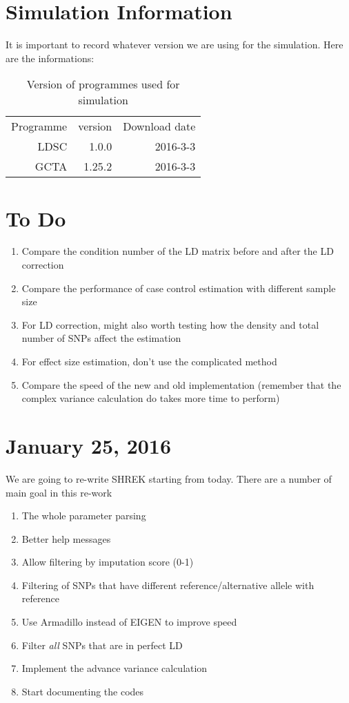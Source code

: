 \documentclass[12pt]{article}
\begin{document}
	\section{Simulation Information}
		It is important to record whatever version we are using for the simulation. 
		Here are the informations:
		\begin{table}
			\centering
			\caption{Version of programmes used for simulation}
			\begin{tabular}{rrr}
				Programme & version & Download date\\
				LDSC & 1.0.0 & 2016-3-3 \\
				GCTA & 1.25.2 & 2016-3-3
			\end{tabular}
		\end{table}
	
	\section{To Do}
	\begin{enumerate}
		\item Compare the condition number of the LD matrix before and after the LD correction
		\item Compare the performance of case control estimation with different sample size 
		\item For LD correction, might also worth testing how the density and total number of SNPs affect the estimation
		\item For effect size estimation, don't use the complicated method
		\item Compare the speed of the new and old implementation (remember that the complex variance calculation do takes more time to perform)
	\end{enumerate}
	
	
	
	\section{January 25, 2016}
	We are going to re-write SHREK starting from today. 
	There are a number of main goal in this re-work
	\begin{enumerate}
		\item The whole parameter parsing 
		\item Better help messages
		\item Allow filtering by imputation score (0-1)
		\item Filtering of SNPs that have different reference/alternative allele with reference
		\item Use Armadillo instead of EIGEN to improve speed
		\item Filter \emph{all} SNPs that are in perfect LD
		\item Implement the advance variance calculation 
		\item Start documenting the codes
	\end{enumerate}
\end{document}
